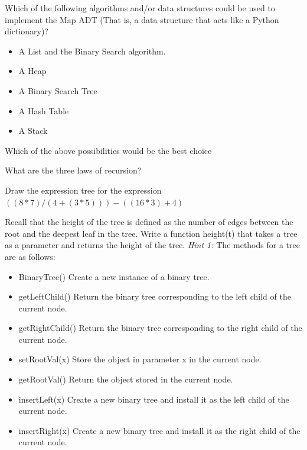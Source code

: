\documentclass[11pt]{exam}
\begin{document}
\begin{questions}

\question[5] Which of the following algorithms and/or data structures could be used to implement the Map ADT (That is, a data structure that acts like a Python dictionary)?
\begin{itemize}
\item A List and the Binary Search algorithm.
\item A Heap
\item A Binary Search Tree
\item A Hash Table
\item A Stack
\end{itemize}

\question[2] Which of the above possibilities would be the best choice
\vspace{1in}

\question[3] What are the three laws of recursion?
\vspace{1in}

\question[10] Draw the expression tree for the expression $((8 * 7) / (4 + (3 * 5))) - ((16 * 3) + 4)$  

\newpage
\question[10]  Recall that the height of the tree is defined as the number of edges between the root and the deepest leaf in the tree.  Write a function height(t) that takes a tree as a parameter and returns the height of the tree.  \textit{Hint 1:} The methods for a tree are as follows:
\begin{itemize}

    \item BinaryTree()  Create a new instance of a binary tree.
    \item getLeftChild() Return the binary tree corresponding to the left child of the current node.
    \item getRightChild() Return the binary tree corresponding to the right child of the current node.
    \item setRootVal(x) Store the object in parameter x in the current node.
    \item getRootVal() Return the object stored in the current node.
    \item insertLeft(x) Create a new binary tree and install it as the left child of the current node.
    \item insertRight(x) Create a new binary tree and install it as the right child of the current node.

\end{itemize}


\end{questions}
\end{document}
